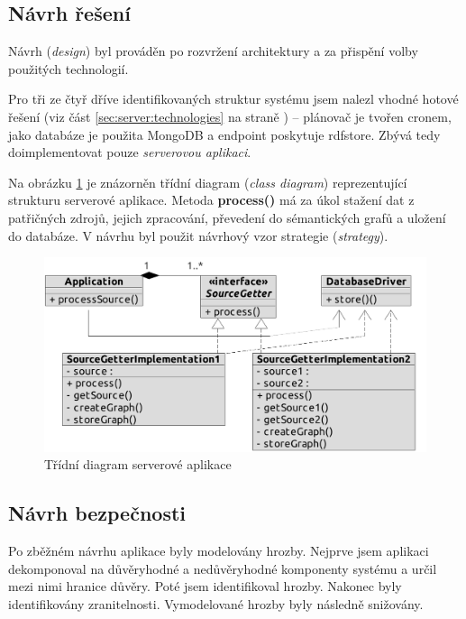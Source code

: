 \subsection{Návrh řešení}
Návrh (\textit{design}) byl prováděn po rozvržení architektury a za přispění volby použitých technologií.

Pro tři ze čtyř dříve identifikovaných struktur systému jsem nalezl vhodné hotové řešení (viz část \ref{sec:server:technologies} na straně \pageref{sec:server:technologies}) -- plánovač je tvořen cronem, jako databáze je použita MongoDB a  endpoint poskytuje rdfstore. Zbývá tedy doimplementovat pouze \textit{serverovou aplikaci}.

Na obrázku \ref{fig:server:class} je znázorněn třídní diagram (\textit{class diagram}) reprezentující strukturu serverové aplikace. Metoda \textbf{process()} má za úkol stažení dat z patřičných zdrojů, jejich zpracování, převedení do sémantických grafů a uložení do databáze. V návrhu byl použit návrhový vzor strategie (\textit{strategy}).

\begin{figure}[h]
 \centering
 \includegraphics[width=11.47cm]{./figures/class-s.pdf}
 \caption{Třídní diagram serverové aplikace}
 \label{fig:server:class}
\end{figure}



\subsection{Návrh bezpečnosti}
Po zběžném návrhu aplikace byly modelovány hrozby. Nejprve jsem aplikaci dekomponoval na důvěryhodné a nedůvěryhodné komponenty systému a určil mezi nimi hranice důvěry. Poté jsem identifikoval hrozby. Nakonec byly identifikovány zranitelnosti. Vymodelované hrozby byly následně snižovány.

